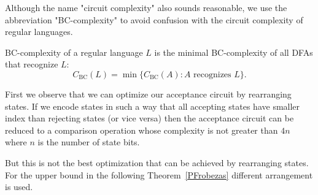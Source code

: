 \documentclass[copyright, creativecommons]{eptcs}
\newcommand{\cBC}{C_\mathrm{BC}}
\newenvironment{definition}[1][Definition]{\begin{trivlist}
\item[\hskip \labelsep {\bfseries #1}]}{\end{trivlist}}
\begin{document}
Although the name "circuit complexity" also sounds reasonable,
we use the abbreviation "BC-complexity" to avoid confusion
with the circuit complexity of regular languages.
\begin{definition}
BC-complexity of a regular language $L$ is the minimal BC-complexity of all DFAs
that recognize $L$:
$$\cBC(L)=\min\{\cBC(A):A \mbox{ recognizes } L\}.$$
\end{definition}


First we observe that we can optimize our acceptance circuit by rearranging states. If we encode states
in such a way that all accepting states have smaller index than rejecting states (or vice versa) then the acceptance circuit
can be reduced to a comparison operation whose complexity is not greater than $4n$ where $n$ is the number of state bits. 


But this is not the best optimization that can be achieved by rearranging states.
For the upper bound in the following Theorem~\ref{PFrobezas} different arrangement is used.
\end{document}
